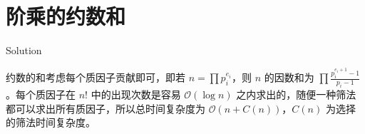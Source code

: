 \section{阶乘的约数和}

\begin{frame}{Solution}

约数的和考虑每个质因子贡献即可，即若 $n=\prod p_i^{e_i}$，则 $n$ 的因数和为 $\prod \frac{p_i^{e_i+1}-1}{p_i-1}$。每个质因子在 $n!$ 中的出现次数是容易 $\mathcal O(\log n)$ 之内求出的，随便一种筛法都可以求出所有质因子，所以总时间复杂度为 $\mathcal O(n+C(n))$，$C(n)$ 为选择的筛法时间复杂度。

\end{frame}
